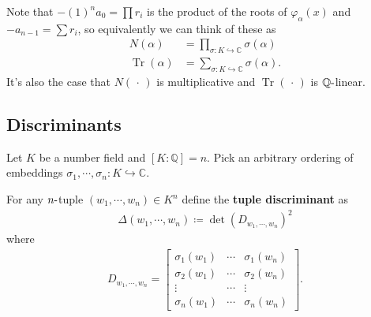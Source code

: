 \begin{remark}

Note that \(-(1)^n a_0 = \prod r_i\) is the product of the roots of
\(\varphi_{ \alpha} (x)\) and \(-a_{n-1} = \sum r_i\), so equivalently
we can think of these as
\begin{align*}
N( \alpha ) &= \prod_{ \sigma: K \hookrightarrow{\mathbb{C}}} \sigma( \alpha) \\
\operatorname{Tr}( \alpha ) &= \sum_{\sigma: K \hookrightarrow{\mathbb{C}}} \sigma( \alpha) 
.\end{align*}
It's also the case that \(N({\,\cdot\,})\) is multiplicative and
\(\operatorname{Tr}({\,\cdot\,})\) is \({\mathbb{Q}}{\hbox{-}}\)linear.

\end{remark}

\hypertarget{discriminants}{%
\subsection{Discriminants}\label{discriminants}}

\begin{remark}

Let \(K\) be a number field and \([K : {\mathbb{Q}}] = n\). Pick an
arbitrary ordering of embeddings
\(\sigma_1, \cdots, \sigma_n: K \hookrightarrow{\mathbb{C}}\).

\end{remark}

\begin{definition}

For any \(n{\hbox{-}}\)tuple \((w_1, \cdots, w_n) \in K^n\) define the
\textbf{tuple discriminant} as
\begin{align*}
\Delta(w_1, \cdots, w_n) \coloneqq\det( D_{w_1, \cdots, w_n} )^2 
\end{align*}
where
\begin{align*}
D_{w_1, \cdots, w_n}
=
\begin{bmatrix}
\sigma_1(w_1) & \cdots  & \sigma_1(w_n) \\
\sigma_2(w_1) & \cdots  & \sigma_2(w_n) \\
\vdots & \cdots & \vdots \\
\sigma_n(w_1) & \cdots  & \sigma_n(w_n) 
\end{bmatrix}
.\end{align*}

\end{definition}

